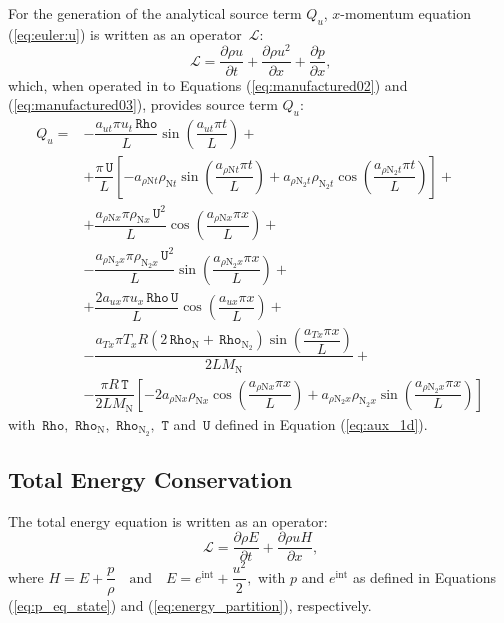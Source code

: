 \documentclass[10pt]{article}
\newcommand{\diff}[2] {\dfrac{\partial #1 }{\partial #2}}
\newcommand{\Lo}{\,\mathcal{L}}
\newcommand{\Rho}{\,\mathtt{Rho}}
\newcommand{\T}{\,\mathtt{T}}
\newcommand{\U}{\,\mathtt{U}}
\newcommand{\N}{\text{N}}
\begin{document}
For the generation of the analytical source term $Q_u$, $x$-momentum equation (\ref{eq:euler:u}) is written as an operator $\Lo$:
\begin{equation*}
 \label{eq:euler1d_12}
\Lo =\diff{\rho u}{t}+\diff{\rho u^2}{x}+\diff{p}{x},
\end{equation*}
which, when operated in to Equations (\ref{eq:manufactured02}) and (\ref{eq:manufactured03}), provides source term $Q_{u}$:
%
\begin{equation}
\begin{split}
Q_u =&-\dfrac{a_{ut} \pi u_t \Rho }{L}\sin\left(\dfrac{a_{ut} \pi t}{L}\right) +\\ 
&+\dfrac{ \pi \U}{L} \left[-a_{\rho \N t} \rho_{\N t} \sin\left(\dfrac{a_{\rho \N t} \pi t}{L}\right)+a_{\rho \N_2 t} \rho_{\N_2 t} \cos\left(\dfrac{a_{\rho \N_2 t} \pi t}{L}\right)\right] +\\
&+\dfrac{ a_{  \rho \N x } \pi \rho_{\N x} \U^2  }{L}\cos\left(\dfrac{a_{  \rho \N x } \pi x}{L}\right) +\\ 
&-\dfrac{a_{  \rho \N_2 x } \pi \rho_{\N_2 x} \U^2  }{L}\sin\left(\dfrac{a_{  \rho \N_2 x } \pi x}{L}\right) +\\ 
&+\dfrac{2 a_{ux} \pi u_x \Rho \U }{L}\cos\left(\dfrac{a_{ux} \pi x}{L}\right)  +\\ 
&-\dfrac{ a_{Tx} \pi T_x R  (2 \Rho_{\N}+\Rho_{\N_2})\sin\left(\dfrac{a_{Tx} \pi x}{L}\right) }{2L M_\N} +\\ 
&-\dfrac{ \pi R \T}{2L M_\N} \left[-2 a_{  \rho \N x } \rho_{\N x} \cos\left(\dfrac{a_{  \rho \N x } \pi x}{L}\right) +a_{  \rho \N_2 x } \rho_{\N_2 x} \sin\left(\dfrac{a_{  \rho \N_2 x } \pi x}{L}\right) \right]
\end{split}
\end{equation}
with $\Rho,\,\Rho_{\text{N}},\,\Rho_{\text{N}_2},\, \T$ and $\U$ defined in Equation (\ref{eq:aux_1d}).

\subsection{Total Energy Conservation}
The total energy equation is written as an operator:
\begin{equation*}
 \label{eq:euler1d_14}
\Lo =\diff{\rho E}{t}+\diff{\rho u H}{x} ,
\end{equation*}
where $H= E+ \dfrac{p}{\rho} \quad \mbox{and}\quad E=e^{\text{int}} + \dfrac{u^2 }{2} ,$ with $p$ and $e^{\text{int}}$ as defined in Equations (\ref{eq:p_eq_state}) and (\ref{eq:energy_partition}), respectively.
\end{document}
